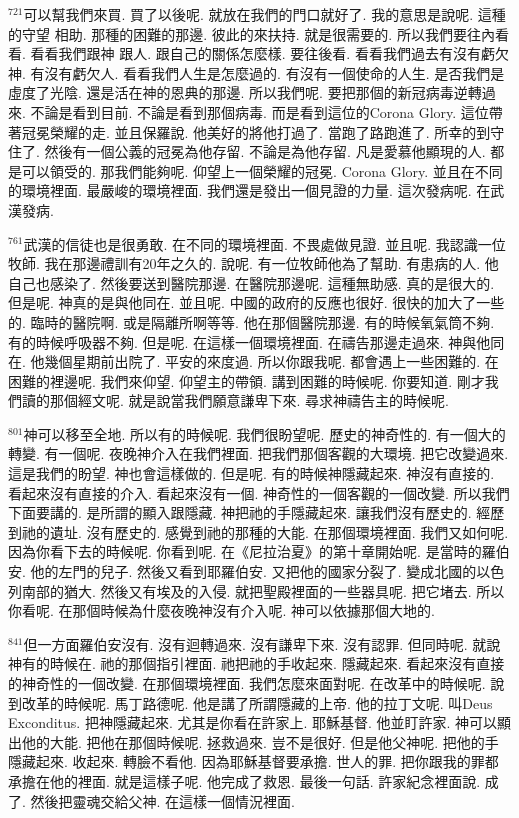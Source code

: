 \documentclass{book}
\begin{document}
$^{721}$可以幫我們來買.
買了以後呢.
就放在我們的門口就好了.
我的意思是說呢.
這種的守望 相助.
那種的困難的那邊.
彼此的來扶持.
就是很需要的.
所以我們要往內看看.
看看我們跟神 跟人.
跟自己的關係怎麼樣.
要往後看.
看看我們過去有沒有虧欠神.
有沒有虧欠人.
看看我們人生是怎麼過的.
有沒有一個使命的人生.
是否我們是虛度了光陰.
還是活在神的恩典的那邊.
所以我們呢.
要把那個的新冠病毒逆轉過來.
不論是看到目前.
不論是看到那個病毒.
而是看到這位的Corona Glory.
這位帶著冠冕榮耀的走.
並且保羅說.
他美好的將他打過了.
當跑了路跑進了.
所幸的到守住了.
然後有一個公義的冠冕為他存留.
不論是為他存留.
凡是愛慕他顯現的人.
都是可以領受的.
那我們能夠呢.
仰望上一個榮耀的冠冕.
Corona Glory.
並且在不同的環境裡面.
最嚴峻的環境裡面.
我們還是發出一個見證的力量.
這次發病呢.
在武漢發病.

$^{761}$武漢的信徒也是很勇敢.
在不同的環境裡面.
不畏處做見證.
並且呢.
我認識一位牧師.
我在那邊禮訓有20年之久的.
說呢.
有一位牧師他為了幫助.
有患病的人.
他自己也感染了.
然後要送到醫院那邊.
在醫院那邊呢.
這種無助感.
真的是很大的.
但是呢.
神真的是與他同在.
並且呢.
中國的政府的反應也很好.
很快的加大了一些的.
臨時的醫院啊.
或是隔離所啊等等.
他在那個醫院那邊.
有的時候氧氣筒不夠.
有的時候呼吸器不夠.
但是呢.
在這樣一個環境裡面.
在禱告那邊走過來.
神與他同在.
他幾個星期前出院了.
平安的來度過.
所以你跟我呢.
都會遇上一些困難的.
在困難的裡邊呢.
我們來仰望.
仰望主的帶領.
講到困難的時候呢.
你要知道.
剛才我們讀的那個經文呢.
就是說當我們願意謙卑下來.
尋求神禱告主的時候呢.

$^{801}$神可以移至全地.
所以有的時候呢.
我們很盼望呢.
歷史的神奇性的.
有一個大的轉變.
有一個呢.
夜晚神介入在我們裡面.
把我們那個客觀的大環境.
把它改變過來.
這是我們的盼望.
神也會這樣做的.
但是呢.
有的時候神隱藏起來.
神沒有直接的.
看起來沒有直接的介入.
看起來沒有一個.
神奇性的一個客觀的一個改變.
所以我們下面要講的.
是所謂的顯入跟隱藏.
神把祂的手隱藏起來.
讓我們沒有歷史的.
經歷到祂的遺址.
沒有歷史的.
感覺到祂的那種的大能.
在那個環境裡面.
我們又如何呢.
因為你看下去的時候呢.
你看到呢.
在《尼拉治夏》的第十章開始呢.
是當時的羅伯安.
他的左門的兒子.
然後又看到耶羅伯安.
又把他的國家分裂了.
變成北國的以色列南部的猶大.
然後又有埃及的入侵.
就把聖殿裡面的一些器具呢.
把它堵去.
所以你看呢.
在那個時候為什麼夜晚神沒有介入呢.
神可以依據那個大地的.

$^{841}$但一方面羅伯安沒有.
沒有迴轉過來.
沒有謙卑下來.
沒有認罪.
但同時呢.
就說神有的時候在.
祂的那個指引裡面.
祂把祂的手收起來.
隱藏起來.
看起來沒有直接的神奇性的一個改變.
在那個環境裡面.
我們怎麼來面對呢.
在改革中的時候呢.
說到改革的時候呢.
馬丁路德呢.
他是講了所謂隱藏的上帝.
他的拉丁文呢.
叫Deus Exconditus.
把神隱藏起來.
尤其是你看在許家上.
耶穌基督.
他並盯許家.
神可以顯出他的大能.
把他在那個時候呢.
拯救過來.
豈不是很好.
但是他父神呢.
把他的手隱藏起來.
收起來.
轉臉不看他.
因為耶穌基督要承擔.
世人的罪.
把你跟我的罪都承擔在他的裡面.
就是這樣子呢.
他完成了救恩.
最後一句話.
許家紀念裡面說.
成了.
然後把靈魂交給父神.
在這樣一個情況裡面.
\end{document}
